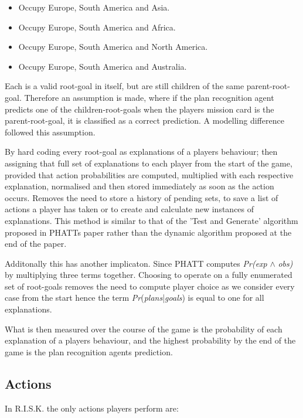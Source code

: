 \documentclass[parskip]{cs4rep}
\begin{document}
\begin{itemize}
\item
Occupy Europe, South America and Asia.
\item
Occupy Europe, South America and Africa.
\item
Occupy Europe, South America and North America.
\item
Occupy Europe, South America and Australia.\newline
\end{itemize}

Each is a valid root-goal in itself, but are still children of the same parent-root-goal. Therefore an assumption is made, where if the plan recognition agent predicts one of the children-root-goals when the players mission card is the parent-root-goal, it is classified as a correct prediction. A modelling difference followed this assumption.

By hard coding every root-goal as explanations of a players behaviour; then assigning that full set of explanations to each player from the start of the game, provided that action probabilities are computed, multiplied with each respective explanation, normalised and then stored immediately as soon as the action occurs. Removes the need to store a history of pending sets, to save a list of actions a player has taken or to create and calculate new instances of explanations. This method is similar to that of the 'Test and Generate' algorithm proposed in PHATTs paper rather than the dynamic algorithm proposed at the end of the paper.

Additonally this has another implicaton. Since PHATT computes \textit{Pr(exp} $\wedge$ \textit{obs)} by multiplying three terms together. Choosing to operate on a fully enumerated set of root-goals removes the need to compute player choice as we consider every case from the start hence the term \textit{Pr}(\textit{plans}|\textit{goals}) is equal to one for all explanations.

What is then measured over the course of the game is the probability of each explanation of a players behaviour, and the highest probability by the end of the game is the plan recognition agents prediction.

\subsection{Actions}

In R.I.S.K. the only actions players perform are:
\end{document}

